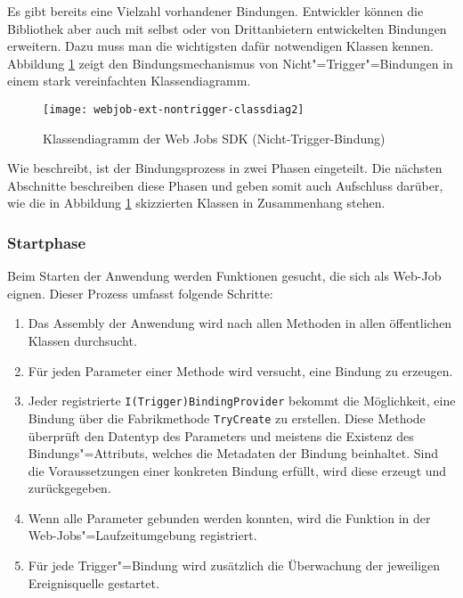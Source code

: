 Es gibt bereits eine Vielzahl vorhandener Bindungen. Entwickler können die Bibliothek aber auch mit selbst oder von Drittanbietern entwickelten Bindungen erweitern. Dazu muss man die wichtigsten dafür notwendigen Klassen kennen. Abbildung \ref{fig:webjobsclassdiag} zeigt den Bindungsmechanismus von Nicht"=Trigger"=Bindungen in einem stark vereinfachten Klassendiagramm.

\begin{figure}[!hbt]%
\texttt{[image: webjob-ext-nontrigger-classdiag2]}%
\caption{Klassendiagramm der Web Jobs SDK (Nicht-Trigger-Bindung)}%
\label{fig:webjobsclassdiag}%
\end{figure}

Wie \cite{WebJobsSdkBindingProcess} beschreibt, ist der Bindungsprozess in zwei Phasen eingeteilt. Die nächsten Abschnitte beschreiben diese Phasen und geben somit auch Aufschluss darüber, wie die in Abbildung \ref{fig:webjobsclassdiag} skizzierten Klassen in Zusammenhang stehen.

\subsubsection{Startphase}

Beim Starten der Anwendung werden Funktionen gesucht, die sich als Web-Job eignen. Dieser Prozess umfasst folgende Schritte:

\begin{enumerate}
	\item Das Assembly der Anwendung wird nach allen Methoden in allen öffentlichen Klassen durchsucht.
	\item Für jeden Parameter einer Methode wird versucht, eine Bindung zu erzeugen.
	\item Jeder registrierte \lstinline{I(Trigger)BindingProvider} bekommt die Möglichkeit, eine Bindung über die Fabrikmethode \lstinline{TryCreate} zu erstellen. Diese Methode überprüft den Datentyp des Parameters und meistens die Existenz des Bindungs"=Attributs, welches die Metadaten der Bindung beinhaltet. Sind die Voraussetzungen einer konkreten Bindung erfüllt, wird diese erzeugt und zurückgegeben.
	\item Wenn alle Parameter gebunden werden konnten, wird die Funktion in der Web-Jobs"=Laufzeitumgebung registriert.
	\item Für jede Trigger"=Bindung wird zusätzlich die Überwachung der jeweiligen Ereignisquelle gestartet.
\end{enumerate}

